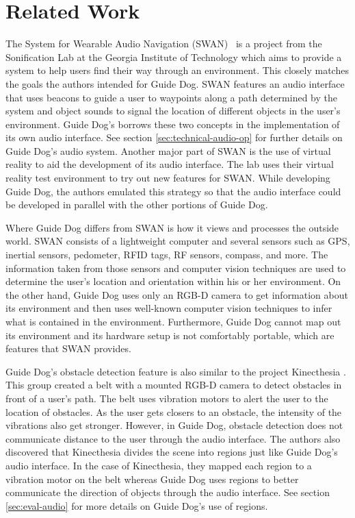 \section{Related Work}
\label{sec:related}


The System for Wearable Audio Navigation (SWAN)~\cite{swan-website} is a project
from the Sonification Lab at the Georgia Institute of Technology which aims to
provide a system to help users find their way through an environment. This
closely matches the goals the authors intended for Guide Dog. SWAN features an
audio interface that uses beacons to guide a user to waypoints along a path
determined by the system and object sounds to signal the location of different
objects in the user's environment. Guide Dog's borrows these two concepts in the
implementation of its own audio interface. See section
\ref{sec:technical-audio-op} for further details on Guide Dog's audio system.
Another major part of SWAN is the use of virtual reality to aid the development
of its audio interface. The lab uses their virtual reality test environment to
try out new features for SWAN. While developing Guide Dog, the authors emulated
this strategy so that the audio interface could be developed in parallel with
the other portions of Guide Dog.

Where Guide Dog differs from SWAN is how it views and processes the outside
world. SWAN consists of a lightweight computer and several sensors such as GPS,
inertial sensors, pedometer, RFID tags, RF sensors, compass, and more. The
information taken from those sensors and computer vision techniques are used to
determine the user's location and orientation within his or her environment. On
the other hand, Guide Dog uses only an RGB-D camera to get information about its
environment and then uses well-known computer vision techniques to infer what is
contained in the environment. Furthermore, Guide Dog cannot map out its
environment and its hardware setup is not comfortably portable, which are
features that SWAN provides.

Guide Dog's obstacle detection feature is also similar to the project Kinecthesia
\cite{kinecthesia-website}. This group created a belt with a mounted RGB-D
camera to detect obstacles in front of a user's path. The belt uses vibration
motors to alert the user to the location of obstacles. As the user gets closers
to an obstacle, the intensity of the vibrations also get stronger. However, in
Guide Dog, obstacle detection does not communicate distance to the user through
the audio interface. The authors also discovered that Kinecthesia divides the
scene into regions just like Guide Dog's audio interface. In the case of
Kinecthesia, they mapped each region to a vibration motor on the belt whereas
Guide Dog uses regions to better communicate the direction of objects through
the audio interface. See section \ref{sec:eval-audio} for more details on Guide
Dog's use of regions.
